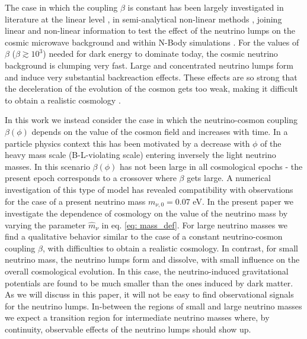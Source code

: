 The case in which the coupling $\beta$ is constant has been largely
investigated in literature at the linear level \cite{mota_neutrino_2008},
in semi-analytical non-linear methods \cite{wintergerst_clarifying_2010,wintergerst_very_2010,brouzakis_nonlinear_2011},
joining linear and non-linear information to test the effect of the
neutrino lumps on the cosmic microwave background \cite{pettorino_neutrino_2010}
and within N-Body simulations \cite{ayaita_neutrino_2013,ayaita_structure_2012,baldi_oscillating_2011,ayaita_nonlinear_2016}.
For the values of $\beta$ ($\beta\gtrsim10^{3}$) needed for dark
energy to dominate today, the cosmic neutrino background is clumping
very fast. Large and concentrated neutrino lumps form and induce very
substantial backreaction effects. These effects are so strong that
the deceleration of the evolution of the cosmon gets too weak, making
it difficult to obtain a realistic cosmology \cite{fuhrer_backreaction_2015}.

In this work we instead consider the case in which the neutrino-cosmon
coupling $\beta(\phi)$ depends on the value of the cosmon field and
increases with time. In a particle physics context this has been motivated
\cite{wetterich_growing_2007} by a decrease with $\phi$ of the heavy
mass scale (B-L-violating scale) entering inversely the light neutrino
masses. In this scenario $\beta(\phi)$ has not been large in all
cosmological epochs - the present epoch corresponds to a crossover
where $\beta$ gets large. A numerical investigation \cite{baldi_oscillating_2011}
of this type of model has revealed compatibility with observations
for the case of a present neutrino mass $m_{\nu,0}=0.07$ eV. In the
present paper we investigate the dependence of cosmology on the value
of the neutrino mass by varying the parameter $\hat{m}_{\nu}$ in
eq. \ref{eq: mass_def}. For large neutrino masses we find a
qualitative behavior similar to the case of a constant neutrino-cosmon
coupling $\beta$, with difficulties to obtain a realistic cosmology.
In contrast, for small neutrino mass, the neutrino lumps form and
dissolve, with small influence on the overall cosmological evolution.
In this case, the neutrino-induced gravitational potentials are found
to be much smaller than the ones induced by dark matter. As we will
discuss in this paper, it will not be easy to find observational signals
for the neutrino lumps. In-between the regions of small and large
neutrino masses we expect a transition region for intermediate neutrino
masses where, by continuity, observable effects of the neutrino lumps
should show up.


